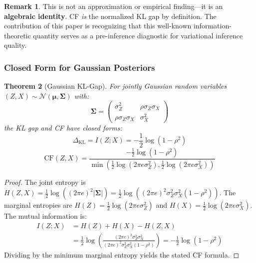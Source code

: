 \documentclass[10pt]{article} %
\theoremstyle{plain}
\newtheorem{theorem}{Theorem}[section]
\theoremstyle{definition}
\newtheorem{remark}[theorem]{Remark}
\newcommand{\CF}{\mathrm{CF}}
\begin{document}
\begin{remark}
This is not an approximation or empirical finding---it is an \textbf{algebraic identity}. CF \emph{is} the normalized KL gap by definition. The contribution of this paper is recognizing that this well-known information-theoretic quantity serves as a pre-inference diagnostic for variational inference quality.
\end{remark}

\subsubsection{Closed Form for Gaussian Posteriors}

\begin{theorem}[Gaussian KL-Gap]
\label{thm:gaussian-kl}
For jointly Gaussian random variables $(Z, X) \sim \mathcal{N}(\boldsymbol{\mu}, \boldsymbol{\Sigma})$ with:
\begin{equation}
\boldsymbol{\Sigma} = \begin{pmatrix} \sigma_Z^2 & \rho \sigma_Z \sigma_X \\ \rho \sigma_Z \sigma_X & \sigma_X^2 \end{pmatrix}
\end{equation}
the KL gap and CF have closed forms:
\begin{equation}
\Delta_{\text{KL}} = I(Z; X) = -\frac{1}{2}\log(1 - \rho^2)
\end{equation}
\begin{equation}
\CF(Z, X) = \frac{-\frac{1}{2}\log(1 - \rho^2)}{\min\left(\frac{1}{2}\log(2\pi e \sigma_Z^2), \frac{1}{2}\log(2\pi e \sigma_X^2)\right)}
\end{equation}
\end{theorem}

\begin{proof}
The joint entropy is $H(Z, X) = \frac{1}{2}\log\left((2\pi e)^2 |\boldsymbol{\Sigma}|\right) = \frac{1}{2}\log\left((2\pi e)^2 \sigma_Z^2 \sigma_X^2 (1 - \rho^2)\right)$. The marginal entropies are $H(Z) = \frac{1}{2}\log(2\pi e \sigma_Z^2)$ and $H(X) = \frac{1}{2}\log(2\pi e \sigma_X^2)$. The mutual information is:
\begin{align}
I(Z; X) &= H(Z) + H(X) - H(Z, X) \\
&= \frac{1}{2}\log\left(\frac{(2\pi e)^2 \sigma_Z^2 \sigma_X^2}{(2\pi e)^2 \sigma_Z^2 \sigma_X^2 (1 - \rho^2)}\right) = -\frac{1}{2}\log(1 - \rho^2)
\end{align}
Dividing by the minimum marginal entropy yields the stated CF formula.
\end{proof}
\end{document}

